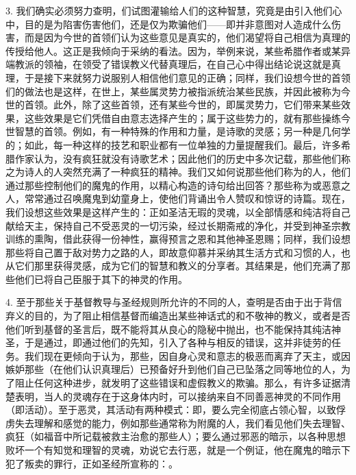 3. 我们确实必须努力查明，们试图灌输给人们的这种智慧，究竟是由引入他们心中，目的是为陷害伤害他们，还是仅为欺骗他们——即并非意图对人造成什么伤害，而是因为今世的首领们认为这些意见是真实的，他们渴望将自己相信为真理的传授给他人。这正是我倾向于采纳的看法。因为，举例来说，某些希腊作者或某异端教派的领袖，在领受了错误教义代替真理后，在自己心中得出结论说这就是真理，于是接下来就努力说服别人相信他们意见的正确；同样，我们设想今世的首领们的做法也是这样，在世上，某些属灵势力被指派统治某些民族，并因此被称为今世的首领。此外，除了这些首领，还有某些今世的，即属灵势力，它们带来某些效果，这些效果是它们凭借自由意志选择产生的；属于这些势力的，就有那些操练今世智慧的首领。例如，有一种特殊的作用和力量，是诗歌的灵感；另一种是几何学的；如此，每一种这样的技艺和职业都有一位单独的力量提醒我们。最后，许多希腊作家认为，没有疯狂就没有诗歌艺术；因此他们的历史中多次记载，那些他们称之为诗人的人突然充满了一种疯狂的精神。我们又如何说那些他们称为的人，他们通过那些控制他们的魔鬼的作用，以精心构造的诗句给出回答？那些称为或恶意之人，常常通过召唤魔鬼到幼童身上，使他们背诵出令人赞叹和惊讶的诗篇。现在，我们设想这些效果是这样产生的：正如圣洁无瑕的灵魂，以全部情感和纯洁将自己献给天主，保持自己不受恶灵的一切污染，经过长期斋戒的净化，并受到神圣宗教训练的熏陶，借此获得一份神性，赢得预言之恩和其他神圣恩赐；同样，我们设想那些将自己置于敌对势力之路的人，即故意仰慕并采纳其生活方式和习惯的人，也从它们那里获得灵感，成为它们的智慧和教义的分享者。其结果是，他们充满了那些他们已将自己臣服于其下的神灵的作用。\par

4. 至于那些关于基督教导与圣经规则所允许的不同的人，查明是否由于出于背信弃义的目的，为了阻止相信基督而编造出某些神话式的和不敬神的教义，或者是否他们听到基督的圣言后，既不能将其从良心的隐秘中抛出，也不能保持其纯洁神圣，于是通过，即通过他们的先知，引入了各种与相反的错误，这并非徒劳的任务。我们现在更倾向于认为，那些，因自身心灵和意志的极恶而离弃了天主，或因嫉妒那些（在他们认识真理后）已预备好升到他们自己已坠落之同等地位的人，为了阻止任何这种进步，就发明了这些错误和虚假教义的欺骗。那么，有许多证据清楚表明，当人的灵魂存在于这身体内时，可以接纳来自不同善恶神灵的不同作用（即活动）。至于恶灵，其活动有两种模式：即，要么完全彻底占领心智，以致俘虏失去理解和感觉的能力，例如那些通常称为附魔的人，我们看见他们失去理智、疯狂（如福音中所记载被救主治愈的那些人）；要么通过邪恶的暗示，以各种思想败坏一个有知觉和理智的灵魂，劝说它去行恶，就是一个例证，他在魔鬼的暗示下犯了叛卖的罪行，正如圣经所宣称的：。\par

